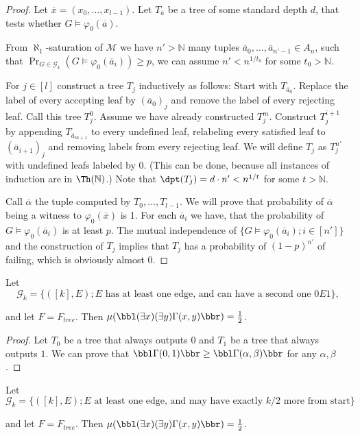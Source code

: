 \begin{proof}
Let $\overline x = (x_0,\dots,x_{l-1})$. Let $T_{\overline a}$ be a tree of some standard depth $d$, that tests whether $G\models\varphi_0(\overline a)$.

From $\aleph_1$-saturation of $\mathcal{M}$ we have $n'>\mathbb{N}$ many tuples \(\overline a_0,\dots,\overline a_{n'-1}\in A_n\), such that \(\Pr_{G\in\mathcal{G}_k}(G\models\varphi_0(\overline a_i))\geq p\), we can assume $n'<n^{1/t_0}$ for some $t_0>\mathbb{N}$.


For $j\in[l]$ construct a tree $T_j$ inductively as follows: Start with $T_{\overline a_0}$. Replace the label of every accepting leaf by $(\overline a_0)_j$ and remove the label of every rejecting leaf. Call this tree $T_j^0$. Assume we have already constructed $T_j^{m}$. Construct $T_j^{i+1}$ by appending $T_{\overline a_{m+1}}$ to every undefined leaf, relabeling every satisfied leaf to $(\overline a_{i+1})_j$ and removing labels from every rejecting leaf. We will define $T_j$ as $T_j^{n'}$ with undefined leafs labeled by $0$. (This can be done, because all instances of induction are in $\Th(\mathbb{N})$.) Note that $\dpt(T_j)=d\cdot n' < n^{1/t}$ for some $t>\mathbb{N}$. 

Call $\overline \alpha$ the tuple computed by $T_0,\dots,T_{l-1}$. We will prove that probability of $\overline \alpha$ being a witness to $\varphi_0(\overline x)$ is 1. For each $\overline a_i$ we have, that the probability of $G\models\varphi_0(\overline a_i)$ is at least $p$. The mutual independence of ${\{G\models\varphi_0(\overline a_i);i\in[n']\}}$ and the construction of $T_j$ implies that $T_j$ has a probability of $(1-p)^{n'}$ of failing, which is obviously almost $0$.
\end{proof}

\begin{exam}
Let \[\mathcal{G}_k=\{([k],E);\text{$E$ has at least one edge, and can have a second one $0E1$}\},\]

and let $F=F_{tree}$. Then $\mu(\bbl(\exists x)(\exists y)\Gamma(x,y)\bbr)=\frac{1}{2}$.
\end{exam}
\begin{proof}
Let $T_0$ be a tree that always outputs $0$ and $T_1$ be a tree that always outputs $1$. We can prove that $\bbl\Gamma(0,1)\bbr\geq\bbl\Gamma(\alpha,\beta)\bbr$ for any $\alpha,\beta$. 
\end{proof}

\begin{exam}
Let \[\mathcal{G}_k=\{([k],E);\text{$E$ at least one edge, and may have exactly $k/2$ more from start}\}\]

and let $F=F_{tree}$. Then $\mu(\bbl(\exists x)(\exists y)\Gamma(x,y)\bbr)=\frac{1}{2}$.
\end{exam}

